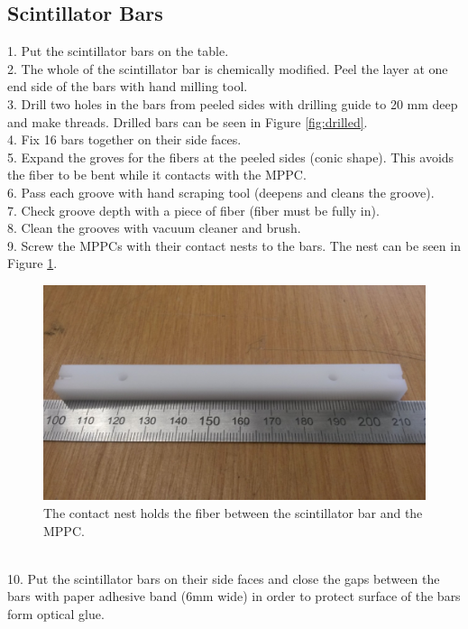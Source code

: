 \documentclass[a4paper]{article}\linespread{1.4}
\begin{document}
\subsection{Scintillator Bars}
1.	Put the scintillator bars on the table.
\\2.	The whole of the scintillator bar is chemically modified. Peel the layer at one end side of the bars with hand milling tool.
\\3.	Drill two holes in the bars from peeled sides with drilling guide to 20 mm deep and make threads. Drilled bars can be seen in Figure \ref{fig:drilled}.
\\4.	Fix 16 bars together on their side faces.
\\5.	Expand the groves for the fibers at the peeled sides (conic shape). This avoids the fiber to be bent while it contacts with the MPPC.
\\6.	Pass each groove with hand scraping tool (deepens and cleans the groove).
\\7.	Check groove depth with a piece of fiber (fiber must be fully in).
\\8.	Clean the grooves with vacuum cleaner and brush.
\\9.	Screw the MPPCs with their contact nests to the bars. The nest can be seen in Figure \ref{fig:nest}.
\begin{figure}[h!] \hspace*{-0.5cm} \includegraphics[width=135mm,scale=2.0]{nestpaint.jpg} \caption{The contact nest holds the fiber between the scintillator bar and the MPPC.}  \label{fig:nest}\end{figure}
\\10.	Put the scintillator bars on their side faces and close the gaps between the bars with paper adhesive band (6mm wide) in order to protect surface of the bars form optical glue.
\end{document}
